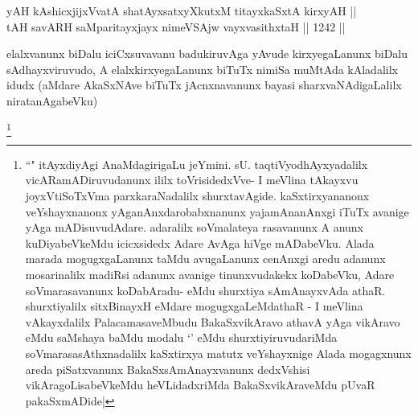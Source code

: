\begin{shl}
yAH kAshicxjijxVvatA shatAyxsatxyXkutxM titayxkaSxtA kirxyAH || \\
tAH savARH saMparitayxjayx nimeVSAjw vayxvasithxtaH ||  1242 ||  
\end{shl}

\begin{artha}
elalxvanunx biDalu iciCxsuvavanu badukiruvAga yAvude kirxyegaLanunx biDalu sAdhayxviruvudo, A elalxkirxyegaLanunx biTuTx nimiSa muMtAda kAladalilx idudx (aMdare AkaSxNAve biTuTx jAcnxnavanunx bayasi sharxvaNAdigaLalilx niratanAgabeVku)
\end{artha}

\begin{artha}
\footnote{``\stext" itAyxdiyAgi AnaMdagirigaLu jeYmini. sU. taqtiVyodhAyxyadalilx vicARamADiruvudanunx ililx toVrisidedxVve- I meVlina tAkayxvu joyxVtiSoTxVma parxkaraNadalilx shurxtavAgide. kaSxtirxyananonx veYshayxnanonx yAganAnxdarobabxnanunx yajamAnanAnxgi iTuTx avanige yAga mADisuvudAdare. adaralilx soVmalateya rasavanunx A anunx kuDiyabeVkeMdu icicxsidedx Adare AvAga hiVge mADabeVku. Alada marada mogugxgaLanunx taMdu avugaLanunx cenAnxgi aredu adanunx mosarinalilx madiRsi adanunx avanige tinunxvudakekx koDabeVku, Adare soVmarasavanunx koDabAradu- eMdu shurxtiya sAmAnayxvAda athaR. shurxtiyalilx sitxBinayxH eMdare mogugxgaLeMdathaR - I meVlina vAkayxdalilx PalacamasaveMbudu BakaSxvikAravo athavA yAga vikAravo eMdu saMshaya baMdu modalu `\stext' eMdu shurxtiyiruvudariMda soVmarasasAthxnadalilx kaSxtirxya matutx veYshayxnige Alada mogagxnunx areda piSatxvanunx BakaSxsAmAnayxvanunx dedxVshisi vikAragoLisabeVkeMdu heVLidadxriMda BakaSxvikAraveMdu pUvaR pakaSxmADide|}
\end{artha}


